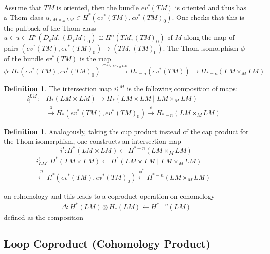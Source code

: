 \documentclass{scrartcl}
\theoremstyle{plain}
\theoremstyle{definition}
\newtheorem{definition}[theorem]{Definition}
\renewcommand{\epsilon}{\varepsilon}
\newcommand{\capp}{\mathbin{\frown}}
\newcommand{\iso}{\cong}
\newcommand{\from}{\leftarrow}
\let\xto\xrightarrow
\let\xfrom\xleftarrow
\begin{document}

Assume that $TM$ is oriented, then the bundle $ev^*(TM)$ is oriented and thus has a Thom class $u_{LM\times_M LM}\in H^*(ev^*(TM), ev^*(TM)_0)$. One checks that this is the pullback of the Thom class $u\in u\in H^n(D_\epsilon M, (D_\epsilon M)_0) \iso H^n(TM, (TM)_0)$ of $M$ along the map of pairs $(ev^*(TM), ev^*(TM)_0) \to (TM, (TM)_0)$. The Thom isomorphism $\phi$ of the bundle $ev^*(TM)$ is the map $$\phi\colon H_*(ev^*(TM), ev^*(TM)_0) \xto{\capp u_{LM\times_M LM}} H_{*-n}(ev^*(TM)) \to H_{*-n}(LM\times_M LM).$$

\begin{definition}\label{def:loop-intersection-classical}
The intersection map $i_!^{LM}$ is the following composition of maps: 
\begin{align*}
    i_!^{LM}\colon &H_*(LM\times LM) \to H_*(LM\times LM \mid LM\times_M LM) \\ &\xto{\eta} H_*(ev^*(TM), ev^*(TM)_0) \xto{\phi} H_{*-n}(LM\times_M LM) &
\end{align*}
\end{definition}

\begin{definition}
    Analogously, taking the cup product instead of the cap product for the Thom isomorphism, one constructs an intersection map $$i^!\colon H^*(LM\times LM)\from H^{*-n}(LM\times_M LM)$$
    \begin{align*}
        i^!_{LM}\colon H^*(LM\times LM) \from H^*(LM\times LM \mid LM\times_M LM) &\\ \xfrom{\eta} H^*(ev^*(TM), ev^*(TM)_0) \xfrom{\phi^*} H^{*-n}(LM\times_M LM) &
    \end{align*}

    on cohomology and this leads to a coproduct operation on cohomology
    \begin{align*}
        \Delta\colon H^*(LM)\otimes H_*(LM)\from H^{*-n}(LM)
    \end{align*}
    defined as the composition
\end{definition}

\subsection{Loop Coproduct (Cohomology Product)}\label{subsec:loop-coproduct-classical}
\end{document}
